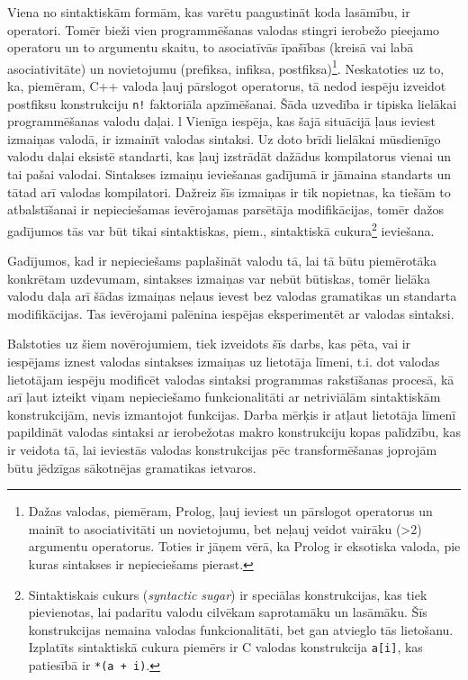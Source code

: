 Viena no sintaktiskām formām, kas varētu paagustināt koda lasāmību, ir operatori. Tomēr bieži vien programmēšanas valodas stingri ierobežo pieejamo operatoru un to argumentu skaitu, to asociatīvās īpašības (kreisā vai labā asociativitāte) un novietojumu (prefiksa, infiksa, postfiksa)\footnote{Dažas valodas, piemēram, Prolog, ļauj ieviest un pārslogot operatorus un mainīt to asociativitāti un novietojumu, bet neļauj veidot vairāku (>2) argumentu operatorus. Toties ir jāņem vērā, ka Prolog ir eksotiska valoda, pie kuras sintakses ir nepieciešams pierast.\cite{PrologStandard}}. Neskatoties uz to, ka, piemēram, C++ valoda ļauj pārslogot operatorus, tā nedod iespēju izveidot postfiksu konstrukciju \verb|n!| faktoriāla apzīmēšanai. Šāda uzvedība ir tipiska lielākai programmēšanas valodu  daļai. %
l
Vienīga iespēja, kas šajā situācijā ļaus ieviest izmaiņas valodā, ir izmainīt valodas sintaksi. Uz doto brīdi lielākai mūsdienīgo valodu daļai eksistē standarti, kas ļauj izstrādāt dažādus kompilatorus vienai un tai pašai valodai. Sintakses izmaiņu ieviešanas gadījumā ir jāmaina standarts un tātad arī valodas kompilatori. Dažreiz šīs izmaiņas ir tik nopietnas, ka tiešām to atbalstīšanai ir nepieciešamas ievērojamas parsētāja modifikācijas, tomēr dažos gadījumos tās var būt tikai sintaktiskas, piem., sintaktiskā cukura\footnote{Sintaktiskais cukurs (\emph{syntactic sugar}) ir speciālas konstrukcijas, kas tiek pievienotas, lai padarītu valodu cilvēkam saprotamāku un lasāmāku. Šīs konstrukcijas nemaina valodas funkcionalitāti, bet gan atvieglo tās lietošanu. Izplatīts sintaktiskā cukura piemērs ir C valodas konstrukcija \texttt{a[i]}, kas patiesībā ir \texttt{*(a + i)}.} ieviešana.

Gadījumos, kad ir nepieciešams paplašināt valodu tā, lai tā būtu piemērotāka konkrētam uzdevumam, sintakses izmaiņas var nebūt būtiskas, tomēr lielāka valodu daļa arī šādas izmaiņas neļaus ievest bez valodas gramatikas un standarta modifikācijas. Tas ievērojami palēnina iespējas eksperimentēt ar valodas sintaksi.

Balstoties uz šiem novērojumiem, tiek izveidots šīs darbs, kas pēta, vai ir iespējams iznest valodas sintakses izmaiņas uz lietotāja līmeni, t.i. dot valodas lietotājam iespēju modificēt valodas sintaksi programmas rakstīšanas procesā, kā arī ļaut izteikt viņam nepieciešamo funkcionalitāti ar netriviālām sintaktiskām konstrukcijām, nevis izmantojot funkcijas. Darba mērķis ir atļaut lietotāja līmenī papildināt valodas sintaksi ar ierobežotas makro konstrukciju kopas palīdzību, kas ir veidota tā, lai ieviestās valodas konstrukcijas pēc transformēšanas joprojām būtu jēdzīgas sākotnējas gramatikas ietvaros.

